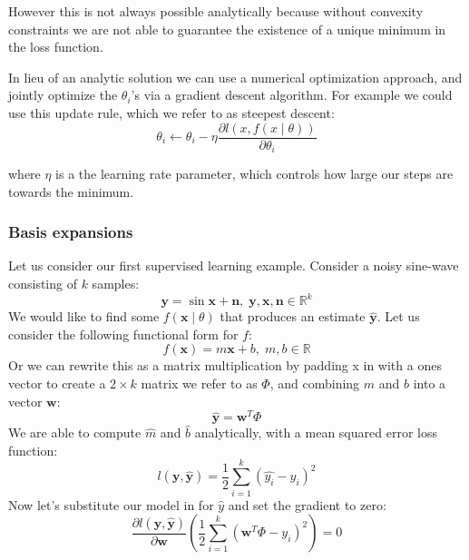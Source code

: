 However this is not always possible analytically because without convexity
constraints we are not able to guarantee the existence of a unique minimum in
the loss function.

In lieu of an analytic solution we can use a numerical optimization approach, and
jointly optimize the $\theta_i$'s via a gradient descent algorithm. For
example we could use this update rule, which we refer to as steepest descent:
\begin{equation}
\theta_i \leftarrow \theta_i - \eta \frac{\partial l(x, f(x \mid \theta))}{\partial \theta_i}
\end{equation}

where $\eta$ is a the learning rate parameter, which controls how large our
steps are towards the minimum.

\subsubsection{Basis expansions}
Let us consider our first supervised learning example. Consider a noisy 
sine-wave consisting of $k$ samples:
\begin{equation}
\mathbf{y} = \sin \mathbf{x} + \mathbf{n}, \; \mathbf{y}, \mathbf{x}, \mathbf{n} \in \mathbb{R}^k
\end{equation}
We would like to find some $f(\mathbf{x} \mid \theta)$ that produces an estimate $\hat{\mathbf{y}}$. Let us consider the following functional form for $f$:
\begin{equation}
f(\mathbf{x}) = m\mathbf{x} + b,\; m,b \in \mathbb{R}
\end{equation}
Or we can rewrite this as a matrix multiplication by padding x in with a ones
vector to create a $2 \times k$ matrix we refer to as $\Phi$, and combining
$m$ and $b$ into a vector $\mathbf{w}$:
\begin{equation}
\hat{\mathbf{y}} = \mathbf{w}^T\Phi
\end{equation}
We are able to compute $\hat{m}$ and $\hat{b}$ analytically, with a mean
squared error loss function:
\begin{equation}
l(\mathbf{y}, \hat{\mathbf{y}}) = \frac{1}{2}\sum\limits_{i=1}^k(\hat{y_i} - y_i)^2
\end{equation}
Now let's substitute our model in for $\hat{y}$ and set the gradient to zero:
\begin{equation}
\frac{\partial l(\mathbf{y}, \hat{\mathbf{y}})}{\partial \mathbf{w}} \left(\frac{1}{2}\sum\limits_{i=1}^k(\mathbf{w}^T\Phi - y_i)^2\right) = 0
\end{equation}
